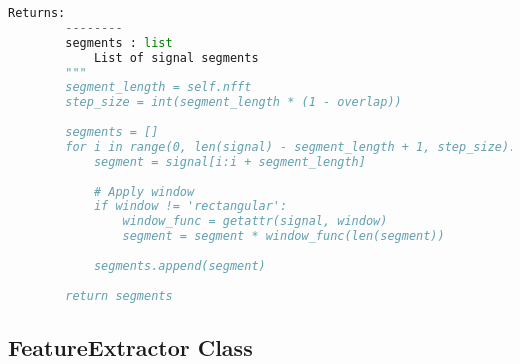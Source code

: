 \begin{lstlisting}[language=Python, caption=HOSAnalyzer class for higher-order spectral analysis]
        Returns:
        --------
        segments : list
            List of signal segments
        """
        segment_length = self.nfft
        step_size = int(segment_length * (1 - overlap))
        
        segments = []
        for i in range(0, len(signal) - segment_length + 1, step_size):
            segment = signal[i:i + segment_length]
            
            # Apply window
            if window != 'rectangular':
                window_func = getattr(signal, window)
                segment = segment * window_func(len(segment))
            
            segments.append(segment)
        
        return segments
\end{lstlisting}

\subsection{FeatureExtractor Class}

